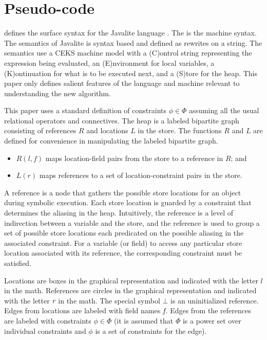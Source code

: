 \section{Pseudo-code}
 defines the surface syntax for the
Javalite language \cite{saints-MS}. The  is
the machine syntax. The semantics of Javalite is syntax based and
defined as rewrites on a string. The semantics use a CEKS machine
model with a (C)ontrol string representing the expression being
evaluated, an (E)nvironment for local variables, a (K)ontinuation for
what is to be executed next, and a (S)tore for the heap. This paper
only defines salient features of the language and machine relevant to
understanding the new algorithm.




This paper uses a standard definition of constraints $\phi \in \Phi$
assuming all the usual relational operators and connectives. The heap
is a labeled bipartite graph consisting of references $R$ and
locations $L$ in the store. The functions $R$ and $L$ are defined for convenience
in manipulating the labeled bipartite graph.
\begin{itemize}
\item $R(l,f)$ maps location-field pairs from the store to a reference in $R$; and
\item $L(r)$ maps references to a set of location-constraint pairs in the store.
\end{itemize}
A reference is a node that gathers the possible store locations for an
object during symbolic execution. Each store location is guarded by a
constraint that determines the aliasing in the heap. Intuitively, the
reference is a level of indirection between a variable and the store,
and the reference is used to group a set of possible store locations
each predicated on the possible aliasing in the associated constraint.
For a variable (or field) to access any particular store location
associated with its reference, the corresponding constraint must be
satisfied.

Locations are boxes in the graphical representation and indicated with
the letter $l$ in the math. References are circles in the graphical
representation and indicated with the letter $\emph{r}$ in the
math. The special symbol $\bot$ is an uninitialized reference. Edges
from locations are labeled with field names $\emph{f}$. Edges from
the references are labeled with constraints $\phi \in \Phi$ (it is
assumed that $\Phi$ is a power set over individual constraints and
$\phi$ is a set of constraints for the edge).

